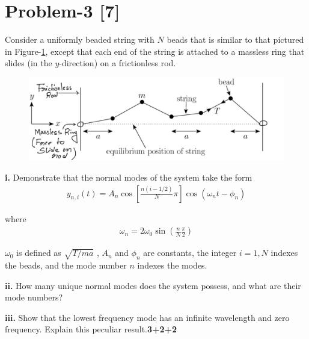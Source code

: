 \documentclass[12pt, a4paper]{article}
\begin{document}
\section*{Problem-3 \hfill \textbf{[7]}}
Consider a uniformly beaded string with $N$ beads that is similar to that pictured in 
Figure-\ref{fig:Nbead-ring}, except that each end of the string is attached to a massless ring that slides 
(in the $y$-direction) on a frictionless rod.
\begin{figure}[h]
    \centering
    \includegraphics[scale=0.25]{figs/Nbead-ring.jpeg}
    \caption{}
    \label{fig:Nbead-ring}
\end{figure}

\textbf{i.} Demonstrate that the normal modes of the system take the form
\begin{align*}
    y_{n,i}(t) = A_n\cos\left[\frac{n(i-1/2)}{N}\pi\right]\cos(\omega_nt-\phi_n)
\end{align*}

where
\begin{align*}
    \omega_n = 2\omega_0\sin\left(\frac{n}{N}\frac{\pi}{2}\right)
\end{align*}

$\omega_0$ is defined as $\sqrt{T/ ma}$ , $A_n$ and $\phi_n$ are constants, the integer $i=1,N$ 
indexes the beads, and the mode number $n$ indexes the modes.

\textbf{ii.} How many unique normal modes does the system possess, and what are their mode numbers?

\textbf{iii.} Show that the lowest frequency mode has an infinite wavelength and zero frequency. 
Explain this peculiar result.\hfill\textbf{3+2+2}


\end{document}
